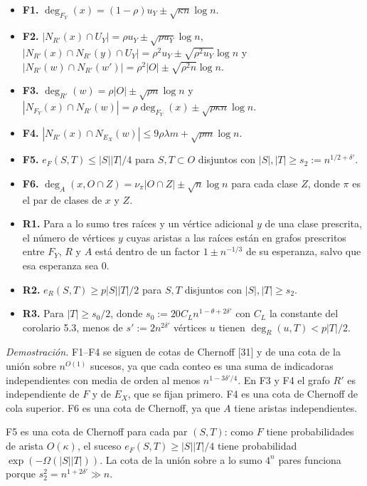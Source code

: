 \documentclass[spanish,11pt,a4paper]{article}
\providecommand{\tightlist}{\setlength{\itemsep}{0pt}\setlength{\parskip}{0pt}}
\begin{document}
\begin{itemize}
\tightlist
\item
  \textbf{F1.} \(\deg_{F_Y}(x)=(1-\rho)u_Y\pm\sqrt{\kappa n}\log n\).
\item
  \textbf{F2.} \(|N_{R'}(x)\cap U_Y|=\rho u_Y\pm\sqrt{\rho u_Y}\log n\), \(|N_{R'}(x)\cap N_{R'}(y)\cap U_Y|=\rho^2u_Y\pm\sqrt{\rho^2u_Y}\log n\) y \(|N_{R'}(w)\cap N_{R'}(w')|=\rho^2|O|\pm\sqrt{\rho^2n}\log n\).
\item
  \textbf{F3.} \(\deg_{R'}(w)=\rho|O|\pm\sqrt{\rho n}\log n\) y \(|N_{F_Y}(x)\cap N_{R'}(w)|=\rho\deg_{F_Y}(x)\pm\sqrt{\rho\kappa n}\log n\).
\item
  \textbf{F4.} \(|N_{R'}(x)\cap N_{E_X}(w)|\le9\rho\lambda m+\sqrt{\rho m}\log n\).
\item
  \textbf{F5.} \(e_F(S,T)\le|S||T|/4\) para \(S,T\subset O\) disjuntos con \(|S|,|T|\ge s_2:=n^{1/2+\delta'}\).
\item
  \textbf{F6.} \(\deg_A(x,O\cap Z)=\nu_\pi|O\cap Z|\pm\sqrt n\log n\) para cada clase \(Z\), donde \(\pi\) es el par de clases de \(x\) y \(Z\).
\item
  \textbf{R1.} Para a lo sumo tres raíces y un vértice adicional \(y\) de una clase prescrita, el número de vértices \(y\) cuyas aristas a las raíces están en grafos prescritos entre \(F_Y\), \(R\) y \(A\) está dentro de un factor \(1\pm n^{-1/3}\) de su esperanza, salvo que esa esperanza sea 0.
\item
  \textbf{R2.} \(e_R(S,T)\ge p|S||T|/2\) para \(S,T\) disjuntos con \(|S|,|T|\ge s_2\).
\item
  \textbf{R3.} Para \(|T|\ge s_0/2\), donde \(s_0:=20C_Ln^{1-\theta+2\delta'}\) con \(C_L\) la constante del corolario 5.3, menos de \(s':=2n^{2\delta'}\) vértices \(u\) tienen \(\deg_R(u,T)<p|T|/2\).
\end{itemize}

\emph{Demostración.} F1--F4 se siguen de cotas de Chernoff {[}31{]} y de una cota de la unión sobre \(n^{O(1)}\) sucesos, ya que cada conteo es una suma de indicadoras independientes con media de orden al menos \(n^{1-3\delta'/4}\). En F3 y F4 el grafo \(R'\) es independiente de \(F\) y de \(E_X\), que se fijan primero. F4 es una cota de Chernoff de cola superior. F6 es una cota de Chernoff, ya que \(A\) tiene aristas independientes.

F5 es una cota de Chernoff para cada par \((S,T)\): como \(F\) tiene probabilidades de arista \(O(\kappa)\), el suceso \(e_F(S,T)\ge|S||T|/4\) tiene probabilidad \(\exp(-\Omega(|S||T|))\). La cota de la unión sobre a lo sumo \(4^n\) pares funciona porque \(s_2^2=n^{1+2\delta'}\gg n\).
\end{document}
